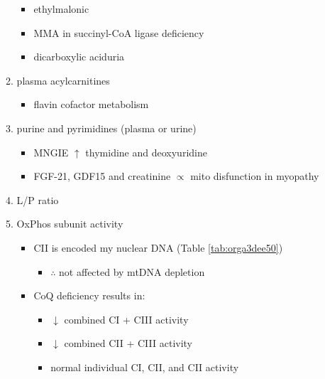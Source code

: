 \documentclass{scrartcl}
\begin{document}
\begin{enumerate}
\begin{enumerate}
\begin{itemize}
\item ethylmalonic
\item MMA in succinyl-CoA ligase deficiency
\item dicarboxylic aciduria
\end{itemize}
\item plasma acylcarnitines
\label{sec:org90b984c}
\begin{itemize}
\item flavin cofactor metabolism
\end{itemize}
\item purine and pyrimidines (plasma or urine)
\label{sec:org0da8e1b}
\begin{itemize}
\item MNGIE \(\uparrow\) thymidine and deoxyuridine
\end{itemize}
\begin{itemize}
\item FGF-21, GDF15 and creatinine \(\propto\) mito disfunction in myopathy
\end{itemize}

\item L/P ratio
\label{sec:orgd8d1c90}
\item OxPhos subunit activity
\label{sec:orgac940f5}
\begin{itemize}
\item CII is encoded my nuclear DNA (Table \ref{tab:orga3dee50})
\begin{itemize}
\item \(\therefore\) not affected by mtDNA depletion
\end{itemize}
\item CoQ deficiency results in:
\begin{itemize}
\item \(\downarrow\) combined CI + CIII activity
\item \(\downarrow\) combined CII + CIII activity
\item normal individual CI, CII, and CII activity
\end{itemize}
\end{itemize}
\end{enumerate}


\end{enumerate}
\end{document}
